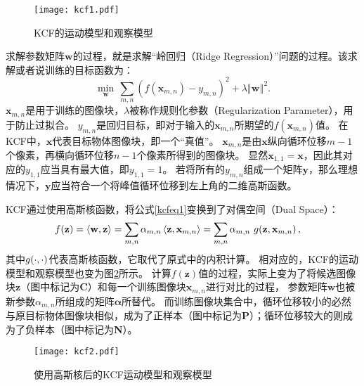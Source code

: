 \begin{figure}[htb]
\centering
\texttt{[image: kcf1.pdf]}
\caption{KCF的运动模型和观察模型}
\label{kcf1}
\end{figure}

求解参数矩阵$\mathbf{w}$的过程，就是求解``岭回归（Ridge Regression）''问题的过程。该求解或者说训练的目标函数为：
\begin{equation}
	\underset{\mathbf{w}}{\min}\,\sum_{m,n}\left(f(\mathbf{x}_{m,n})-y_{m,n}\right)^{2}+\lambda\left\Vert \mathbf{w}\right\Vert ^{2}.
	\label{rrmin}
\end{equation}
$\mathbf{x}_{m,n}$是用于训练的图像块，$\lambda$被称作规则化参数（Regularization Parameter），用于防止过拟合。
$y_{m,n}$是回归目标，即对于输入的$\mathbf{x}_{m,n}$所期望的$f(\mathbf{x}_{m,n})$值。
在KCF中，$\mathbf{x}$代表目标物体图像块，即一个``真值''。
$\mathbf{x}_{m,n}$是由$\mathbf{x}$纵向循环位移$m-1$个像素，再横向循环位移$n-1$个像素所得到的图像块。
显然$\mathbf{x}_{1,1}=\mathbf{x}$，因此其对应的$y_{1,1}$应当具有最大值，即$y_{1,1}=1$。
若将所有的$y_{m,n}$组成一个矩阵$\mathbf{y}$，那么理想情况下，$\mathbf{y}$应当符合一个将峰值循环位移到左上角的二维高斯函数。

KCF通过使用高斯核函数，将公式\ref{kcfeq1}变换到了对偶空间（Dual Space）：
\begin{equation}
\begin{aligned}
	f(\mathbf{z})=\left\langle\mathbf{w}, \mathbf{z}\right\rangle&=\sum_{m,n}\alpha_{m,n}\left\langle\mathbf{z},\mathbf{x}_{m,n}\right\rangle=\sum_{m,n}\alpha_{m,n}\ g\negthinspace\left(\mathbf{z},\mathbf{x}_{m,n}\right),\label{kcf-kernelmodel}
\end{aligned}
\end{equation}
其中$g\negthinspace\left(\cdot, \cdot\right)$代表高斯核函数，它取代了原式中的内积计算。
相对应的，KCF的运动模型和观察模型也变为图\ref{kcf2}所示。
计算$f(\mathbf{z})$值的过程，实际上变为了将候选图像块$\mathbf{z}$（图中标记为\textbf{C}）和每一个训练图像块$\mathbf{x}_{m,n}$进行对比的过程，
参数矩阵$\mathbf{w}$也被新参数$\alpha_{m,n}$所组成的矩阵$\boldsymbol{\alpha}$所替代。
而训练图像块集合中，循环位移较小的必然与原目标物体图像块相似，成为了正样本（图中标记为\textbf{P}）；循环位移较大的则成为了负样本（图中标记为\textbf{N}）。

\begin{figure}[htb]
\centering
\texttt{[image: kcf2.pdf]}
\caption{使用高斯核后的KCF运动模型和观察模型}
\label{kcf2}
\end{figure}

